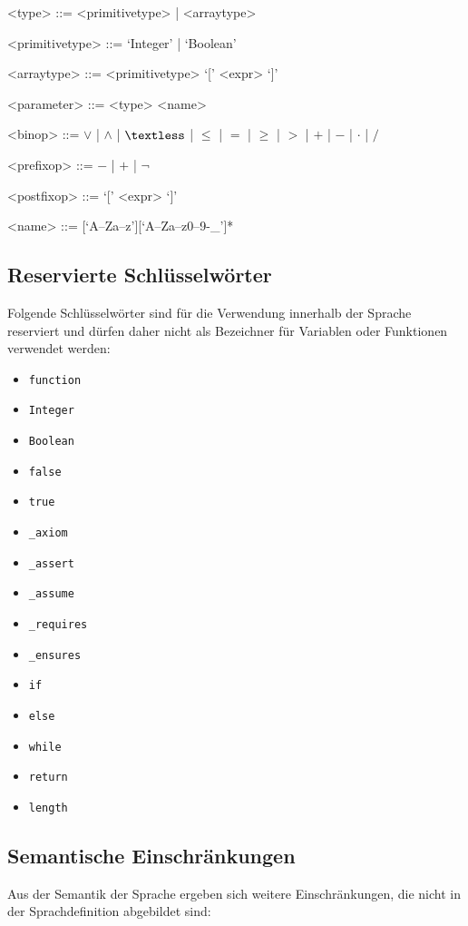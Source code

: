 \begin{grammar}
<type> ::= <primitivetype> | <arraytype>

<primitivetype> ::= `Integer' | `Boolean'

<arraytype> ::= <primitivetype> `[' <expr> `]'

<parameter> ::= <type> <name>

<binop> ::= $\vee$ | $\wedge$ | $\textless$ | $\leq$ | $=$ | $\geq$ | $>$ | $+$ | $-$ | $\cdot$ | $/$

<prefixop> ::= $-$ | $+$ | $\neg$

<postfixop> ::= `[' <expr> `]'

<name> ::=  [`A--Za--z'][`A--Za--z0--9-\_']*

\end{grammar}

\subsection{Reservierte Schlüsselwörter}

Folgende Schlüsselwörter sind für die Verwendung innerhalb der Sprache reserviert und dürfen daher nicht als Bezeichner für Variablen oder Funktionen verwendet werden:

\begin{itemize}
	\item \texttt{function}
	\item \texttt{Integer}
	\item \texttt{Boolean}
	\item \texttt{false}
	\item \texttt{true}	
	\item \texttt{\_axiom}
	\item \texttt{\_assert}
	\item \texttt{\_assume}
	\item \texttt{\_requires}
	\item \texttt{\_ensures}
	\item \texttt{if}
	\item \texttt{else}	
	\item \texttt{while}		
	\item \texttt{return}
	\item \texttt{length}
\end{itemize}

\subsection{Semantische Einschränkungen}
Aus der Semantik der Sprache ergeben sich weitere Einschränkungen, die nicht in der Sprachdefinition abgebildet sind:

